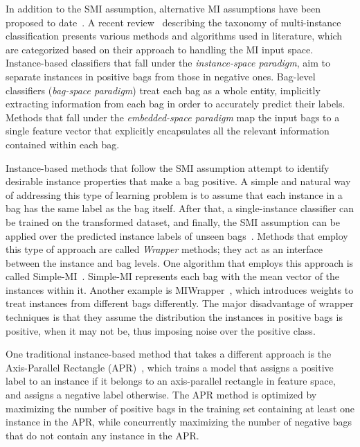\documentclass[reqno]{vcuthesis}
\numberwithin{equation}{chapter}
\begin{document}
In addition to the SMI assumption, alternative MI assumptions have been proposed to date~\cite{Foulds2010}. A recent review~\cite{Amores2013} describing the taxonomy of multi-instance classification presents various methods and algorithms used in literature, which are categorized based on their approach to handling the MI input space. Instance-based classifiers that fall under the \textit{instance-space paradigm}, aim to separate instances in positive bags from those in negative ones. Bag-level classifiers (\textit{bag-space paradigm}) treat each bag as a whole entity, implicitly extracting information from each bag in order to accurately predict their labels. Methods that fall under the \textit{embedded-space paradigm} map the input bags to a single feature vector that explicitly encapsulates all the relevant information contained within each bag.

Instance-based methods that follow the SMI assumption attempt to identify desirable instance properties that make a bag positive. A simple and natural way of addressing this type of learning problem is to assume that each instance in a bag has the same label as the bag itself. After that, a single-instance classifier can be trained on the transformed dataset, and finally, the SMI assumption can be applied over the predicted instance labels of unseen bags~\cite{Ventura2016}. Methods that employ this type of approach are called \textit{Wrapper} methods; they act as an interface between the instance and bag levels. One algorithm that employs this approach is called Simple-MI~\cite{Dong2006}. Simple-MI represents each bag with the mean vector of the instances within it. Another example is MIWrapper~\cite{Frank2003}, which introduces weights to treat instances from different bags differently. The major disadvantage of wrapper techniques is that they assume the distribution the instances in positive bags is positive, when it may not be, thus imposing noise over the positive class.

One traditional instance-based method that takes a different approach is the Axis-Parallel Rectangle (APR)~\cite{Dietterich1997}, which trains a model that assigns a positive label to an instance if it belongs to an axis-parallel rectangle in feature space, and assigns a negative label otherwise. The APR method is optimized by maximizing the number of positive bags in the training set containing at least one instance in the APR, while concurrently maximizing the number of negative bags that do not contain any instance in the APR. 
\end{document}
